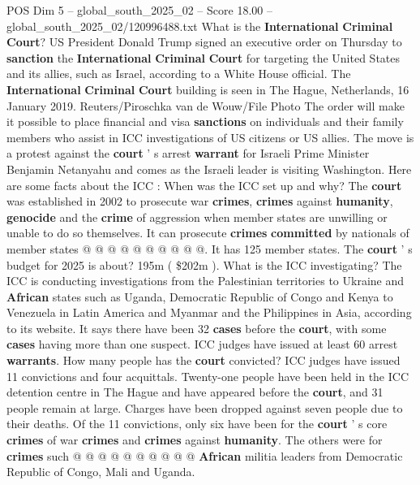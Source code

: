 \begin{textsample}{POS Dim 5 – global\_south\_2025\_02 – Score 18.00 – global\_south\_2025\_02/120996488.txt}  \label{ex:f5_pos_142}
What is the \textbf{International} \textbf{Criminal} \textbf{Court}?
US President Donald Trump signed an executive order on Thursday to \textbf{sanction} the \textbf{International} \textbf{Criminal} \textbf{Court} for targeting the United States and its allies, such as Israel, according to a White House official.
The \textbf{International} \textbf{Criminal} \textbf{Court} building is seen in The Hague, Netherlands, 16 January 2019.
Reuters/Piroschka van de Wouw/File Photo The order will make it possible to place financial and visa \textbf{sanctions} on individuals and their family members who assist in ICC investigations of US citizens or US allies.
The move is a protest against the \textbf{court} ' s arrest \textbf{warrant} for Israeli Prime Minister Benjamin Netanyahu and comes as the Israeli leader is visiting Washington.
Here are some facts about the ICC : When was the ICC set up and why?
The \textbf{court} was established in 2002 to prosecute war \textbf{crimes}, \textbf{crimes} against \textbf{humanity}, \textbf{genocide} and the \textbf{crime} of aggression when member states are unwilling or unable to do so themselves.
It can prosecute \textbf{crimes} \textbf{committed} by nationals of member states @ @ @ @ @ @ @ @ @ @.
It has 125 member states.
The \textbf{court} ' s budget for 2025 is about? 195m ( \$202m ).
What is the ICC investigating?
The ICC is conducting investigations from the Palestinian territories to Ukraine and \textbf{African} states such as Uganda, Democratic Republic of Congo and Kenya to Venezuela in Latin America and Myanmar and the Philippines in Asia, according to its website.
It says there have been 32 \textbf{cases} before the \textbf{court}, with some \textbf{cases} having more than one suspect.
ICC judges have issued at least 60 arrest \textbf{warrants}.
How many people has the \textbf{court} convicted?
ICC judges have issued 11 convictions and four acquittals.
Twenty-one people have been held in the ICC detention centre in The Hague and have appeared before the \textbf{court}, and 31 people remain at large.
Charges have been dropped against seven people due to their deaths.
Of the 11 convictions, only six have been for the \textbf{court} ' s core \textbf{crimes} of war \textbf{crimes} and \textbf{crimes} against \textbf{humanity}.
The others were for \textbf{crimes} such @ @ @ @ @ @ @ @ @ @ \textbf{African} militia leaders from Democratic Republic of Congo, Mali and Uganda.

\end{textsample}
